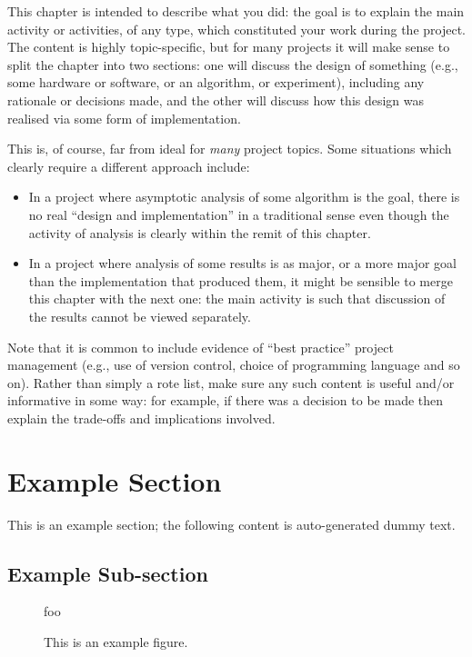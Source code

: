 \documentclass[ %
                    author={Jonathan Rankin},
                supervisor={Dr. David May, Dr. Ian Holyer},
                    degree={MEng},
                     title={CodeTouch},
                  subtitle={A Revolutionary Way To Program Real Code On Touch Screen Devices},
                      type={enterprise},
                      year={2015 } ]{dissertation}
\begin{document}
\noindent
This chapter is intended to describe what you did: the goal is to explain
the main activity or activities, of any type, which constituted your work 
during the project.  The content is highly topic-specific, but for many 
projects it will make sense to split the chapter into two sections: one 
will discuss the design of something (e.g., some hardware or software, or 
an algorithm, or experiment), including any rationale or decisions made, 
and the other will discuss how this design was realised via some form of 
implementation.  

This is, of course, far from ideal for {\em many} project topics.  Some
situations which clearly require a different approach include:

\begin{itemize}
\item In a project where asymptotic analysis of some algorithm is the goal,
      there is no real ``design and implementation'' in a traditional sense
      even though the activity of analysis is clearly within the remit of
      this chapter.
\item In a project where analysis of some results is as major, or a more
      major goal than the implementation that produced them, it might be
      sensible to merge this chapter with the next one: the main activity 
      is such that discussion of the results cannot be viewed separately.
\end{itemize}

\noindent
Note that it is common to include evidence of ``best practice'' project 
management (e.g., use of version control, choice of programming language 
and so on).  Rather than simply a rote list, make sure any such content 
is useful and/or informative in some way: for example, if there was a 
decision to be made then explain the trade-offs and implications 
involved.

\section{Example Section}

This is an example section; 
the following content is auto-generated dummy text.
\lipsum

\subsection{Example Sub-section}

\begin{figure}[t]
\centering
foo
\caption{This is an example figure.}
\label{fig}
\end{figure}
\end{document}
